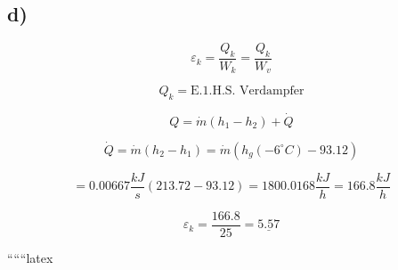 

\subsection*{d)}

\[
\varepsilon_k = \frac{Q_k}{W_k} = \frac{Q_k}{W_v}
\]

\[
Q_k = \text{E.1.H.S. Verdampfer}
\]

\[
Q = \dot{m} (h_1 - h_2) + \dot{Q}
\]

\[
\dot{Q} = \dot{m} (h_2 - h_1) = \dot{m} (h_g (-6^\circ C) - 93.12)
\]

\[
= 0.00667 \frac{kJ}{s} (213.72 - 93.12) = 1800.0168 \frac{kJ}{h} = 166.8 \frac{kJ}{h}
\]

\[
\varepsilon_k = \frac{166.8}{25} = \underline{5.57}
\]

``````latex